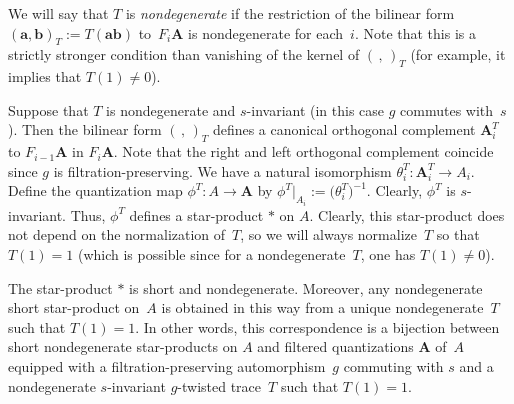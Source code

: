 We will say that $T$ is {\it nondegenerate} if the restriction of the bilinear form $({\mathbf a},{\mathbf b})_T:=T({\mathbf a}{\mathbf b})$ to~$F_i{{\mathbf A}}$ is nondegenerate for each~$i$. Note that this is a strictly stronger condition than vanishing of the kernel of $(\,,\,)_T$ (for example, it implies that $T(1)\ne 0$).

Suppose that $T$ is nondegenerate and $s$-invariant (in this case $g$ commutes with~$s$). Then the bilinear form $(\,,\,)_T$ defines a canonical orthogonal complement ${\mathbf A}^T_i$ to $F_{i-1}{{\mathbf A}}$ in $F_i{{\mathbf A}}$. Note that the right and left orthogonal complement coincide since $g$ is filtration-preserving. We have a natural isomorphism $\theta_i^T\colon {\mathbf A}_i^T\to A_i$. Define the quantization map $\phi^T\colon A\to {{\mathbf A}}$ by $\phi^T|_{A_i}:=\big(\theta_i^T\big)^{-1}$. Clearly, $\phi^T$ is $s$-invariant. Thus, $\phi^T$ defines a star-product $*$ on $A$. Clearly, this star-product does not depend on the normalization of~$T$, so we will always normalize~$T$ so that $T(1)=1$ (which is possible since for a nondegenerate~$T$, one has $T(1)\ne 0$).

\begin{Proposition}[M.~Kontsevich]\label{kon} The star-product $*$ is short and nondegenerate. Moreover, any nondegenerate short star-product on~$A$ is obtained in this way from a unique nondegenerate~$T$ such that $T(1)=1$. In other words, this correspondence is a bijection between short nondegenerate star-products on $A$ and filtered quantizations ${{\mathbf A}}$ of~$A$ equipped with a filtration-preserving automorphism~$g$ commuting with $s$ and a nondegenerate $s$-invariant $g$-twisted trace~$T$ such that $T(1)=1$.
\end{Proposition}

